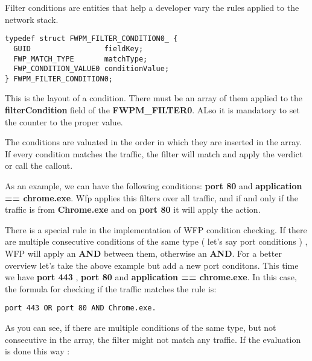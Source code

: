 Filter conditions are entities that help a developer vary the rules applied to the network stack.

\vspace{5mm}

\begin{lstlisting}
typedef struct FWPM_FILTER_CONDITION0_ {
  GUID                 fieldKey;
  FWP_MATCH_TYPE       matchType;
  FWP_CONDITION_VALUE0 conditionValue;
} FWPM_FILTER_CONDITION0;
\end{lstlisting}

\vspace{5mm}

This is the layout of a condition. There must be an array of them applied to the \textbf{filterCondition} field of the \textbf{FWPM\_FILTER0}. ALso it is mandatory to set the counter to the proper value.

\vspace{5mm}

The conditions are valuated in the order in which they are inserted in the array. If every condition matches the traffic, the filter will match and apply the verdict or call the callout. 

\vspace{5mm}

As an example, we can have the following conditions: \textbf{port 80} and \textbf{application == chrome.exe}. Wfp applies this filters over all traffic, and if and only if the traffic is from \textbf{Chrome.exe} and on \textbf{port 80} it will apply the action.

\vspace{5mm}

There is a special rule in the implementation of WFP condition checking. If there are multiple consecutive conditions of the same type ( let's say port conditions ) , WFP will apply an \textbf{AND} between them, otherwise an \textbf{AND}. For a better overview let's take the above example but add
a new port conditons. This time we have \textbf{port 443} , \textbf{port 80} and \textbf{application == chrome.exe}. In this case, the formula for checking if the traffic matches the rule is:
\vspace{5mm}

\begin{lstlisting}
port 443 OR port 80 AND Chrome.exe.
\end{lstlisting}

\vspace{5mm}
As you can see, if there are multiple conditions of the same type, but not consecutive in the array, the filter might not match any traffic. If the evaluation is done this way : 
\vspace{5mm}

